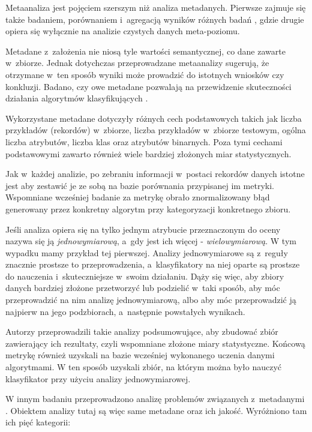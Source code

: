 	Metaanaliza jest pojęciem szerszym niż analiza metadanych.
	Pierwsze zajmuje się także badaniem, porównaniem i~agregacją wyników różnych badań \cite{rosenthal2002meta}, gdzie drugie opiera się wyłącznie na analizie czystych danych meta-poziomu.

	Metadane z~założenia nie niosą tyle wartości semantycznej, co dane zawarte w~zbiorze.
	Jednak dotychczas przeprowadzane metaanalizy sugerują, że otrzymane w~ten sposób wyniki może prowadzić do istotnych wniosków czy konkluzji.
	Badano, czy owe metadane pozwalają na przewidzenie skuteczności działania algorytmów klasyfikujących \cite{brazdil1994characterizing}.

	Wykorzystane metadane dotyczyły różnych cech podstawowych takich jak liczba przykładów (rekordów) w~zbiorze, liczba przykładów w~zbiorze testowym, ogólna liczba atrybutów, liczba klas oraz atrybutów binarnych. Poza tymi cechami podstawowymi zawarto również wiele bardziej złożonych miar statystycznych.

	Jak w~każdej analizie, po zebraniu informacji w~postaci rekordów danych istotne jest aby zestawić je ze sobą na bazie porównania przypisanej im metryki.
	Wspomniane wcześniej badanie \cite{brazdil1994characterizing} za metrykę obrało znormalizowany błąd generowany przez konkretny algorytm przy kategoryzacji konkretnego zbioru.

	Jeśli analiza opiera się na tylko jednym atrybucie przeznaczonym do oceny nazywa się ją \emph{jednowymiarową}, a~gdy jest ich więcej - \emph{wielowymiarową}.
	W tym wypadku mamy przykład tej pierwszej.
	Analizy jednowymiarowe są z~reguły znacznie prostsze to przeprowadzenia, a~klasyfikatory na niej oparte są prostsze do nauczenia i~skuteczniejsze w~swoim działaniu.
	Dąży się więc, aby zbiory danych bardziej złożone przetworzyć lub podzielić w~taki sposób, aby móc przeprowadzić na nim analizę jednowymiarową, albo aby móc przeprowadzić ją najpierw na jego podzbiorach, a~następnie powstałych wynikach.

	Autorzy przeprowadzili takie analizy podsumowujące, aby zbudować zbiór zawierający ich rezultaty, czyli wspomniane złożone miary statystyczne.
	Końcową metrykę również uzyskali na bazie wcześniej wykonanego uczenia danymi algorytmami.
	W ten sposób uzyskali zbiór, na którym można było nauczyć klasyfikator przy użyciu analizy jednowymiarowej.

	W innym badaniu przeprowadzono analizę problemów związanych z~metadanymi \cite{yasser2011analysis}.
	Obiektem analizy tutaj są więc same metadane oraz ich jakość.
	Wyróżniono tam ich pięć kategorii:

